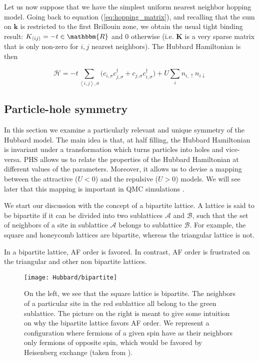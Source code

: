 Let us now suppose that we have the simplest uniform nearest neighbor hopping model.
Going back to equation (\ref{eq:hopping_matrix}), and recalling that the sum on $\bm k$ is restricted to the first Brillouin zone, we obtain the usual tight binding result: $K_{\left\langle i j \right\rangle} = - t \in \mathbbm{R}$ and $0$ otherwise (i.e. $\bm K$ is a very sparse matrix that is only non-zero for $i, j$ nearest neighbors).
The Hubbard Hamiltonian is then

\begin{equation}\label{eq:hubbard_hamiltonian}
\mathcal{H} = - t \sum_{\left\langle i, j \right\rangle, \sigma} \bigg(c_{i,\sigma} c_{j,\sigma}^\dagger + c_{j,\sigma} c_{i,\sigma}^\dagger \bigg) + U \sum_{i} n_{i,\uparrow} n_{i\downarrow}
\end{equation}

\subsection{Particle-hole symmetry}

In this section we examine a particularly relevant and unique symmetry of the Hubbard model.
The main idea is that, at half filling, the Hubbard Hamiltonian is invariant under a transformation which turns particles into holes and vice-versa.
\ac{PHS} allows us to relate the properties of the Hubbard Hamiltonian at different values of the parameters.
Moreover, it allows us to devise a mapping between the attractive ($U < 0$) and the repulsive ($U > 0$) models.
We will see later that this mapping is important in QMC simulations \cite{alavi_quantum_2016}.

We start our discussion with the concept of a bipartite lattice.
A lattice is said to be bipartite if it can be divided into two sublattices $\mathcal{A}$ and $\mathcal{B}$, such that the set of neighbors of a site in sublattice $\mathcal{A}$ belongs to sublattice $\mathcal{B}$.
For example, the square and honeycomb lattices are bipartite, whereas the triangular lattice is not.

In a bipartite lattice, \ac{AF} order is favored.
In contrast, AF order is frustrated on the triangular and other non bipartite lattices.

\begin{figure}[H]\label{fig:bipartite}
\centering
\texttt{[image: Hubbard/bipartite]}
\caption[Bipartite lattices and antiferromagnetic order.]{On the left, we see that the square lattice is bipartite.
The neighbors of a particular site in the red sublattice all belong to the green sublattice.
The picture on the right is meant to give some intuition on why the bipartite lattice favors \ac{AF} order.
We represent a configuration where fermions of a given spin have as their neighbors only fermions of opposite spin, which would be favored by Heisenberg exchange (taken from \cite{alavi_quantum_2016}). }
\end{figure}

